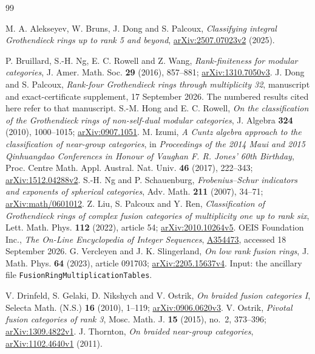\begin{thebibliography}{99}
\raggedright
{} M. A. Alekseyev, W. Bruns, J. Dong and S. Palcoux,
\emph{Classifying integral Grothendieck rings up to rank 5 and beyond},
\href{https://arxiv.org/abs/2507.07023v2}{arXiv:2507.07023v2} (2025).

 P. Bruillard, S.-H. Ng, E. C. Rowell and Z. Wang,
\emph{Rank-finiteness for modular categories}, J. Amer. Math. Soc.
\textbf{29} (2016), 857--881;
\href{https://arxiv.org/abs/1310.7050v3}{arXiv:1310.7050v3}.
 J. Dong and S. Palcoux,
\emph{Rank-four Grothendieck rings through multiplicity 32},
manuscript and exact-certificate supplement, 17 September 2026.
The numbered results cited here refer to that manuscript.
 S.-M. Hong and E. C. Rowell,
\emph{On the classification of the Grothendieck rings of non-self-dual
modular categories}, J. Algebra \textbf{324} (2010), 1000--1015;
\href{https://arxiv.org/abs/0907.1051}{arXiv:0907.1051}.
 M. Izumi,
\emph{A Cuntz algebra approach to the classification of near-group categories},
in \emph{Proceedings of the 2014 Maui and 2015 Qinhuangdao Conferences
in Honour of Vaughan F. R. Jones' 60th Birthday},
Proc. Centre Math. Appl. Austral. Nat. Univ. \textbf{46} (2017), 222--343;
\href{https://arxiv.org/abs/1512.04288v2}{arXiv:1512.04288v2}.
 S.-H. Ng and P. Schauenburg,
\emph{Frobenius--Schur indicators and exponents of spherical categories},
Adv. Math. \textbf{211} (2007), 34--71;
\href{https://arxiv.org/abs/math/0601012}{arXiv:math/0601012}.
 Z. Liu, S. Palcoux and Y. Ren,
\emph{Classification of Grothendieck rings of complex fusion categories
of multiplicity one up to rank six}, Lett. Math. Phys. \textbf{112}
(2022), article 54;
\href{https://arxiv.org/abs/2010.10264v5}{arXiv:2010.10264v5}.
 OEIS Foundation Inc.,
\emph{The On-Line Encyclopedia of Integer Sequences},
\href{https://oeis.org/A354473}{A354473}, accessed 18 September 2026.
 G. Vercleyen and J. K. Slingerland,
\emph{On low rank fusion rings}, J. Math. Phys. \textbf{64} (2023),
article 091703;
\href{https://arxiv.org/abs/2205.15637v4}{arXiv:2205.15637v4}.
Input: the ancillary file \texttt{FusionRingMultiplicationTables}.

 V. Drinfeld, S. Gelaki, D. Nikshych and V. Ostrik,
\emph{On braided fusion categories I}, Selecta Math. (N.S.)
\textbf{16} (2010), 1--119;
\href{https://arxiv.org/abs/0906.0620v3}{arXiv:0906.0620v3}.
 V. Ostrik,
\emph{Pivotal fusion categories of rank 3}, Mosc. Math. J.
\textbf{15} (2015), no.~2, 373--396;
\href{https://arxiv.org/abs/1309.4822v1}{arXiv:1309.4822v1}.
 J. Thornton, \emph{On braided near-group categories},
\href{https://arxiv.org/abs/1102.4640v1}{arXiv:1102.4640v1} (2011).
\end{thebibliography}
